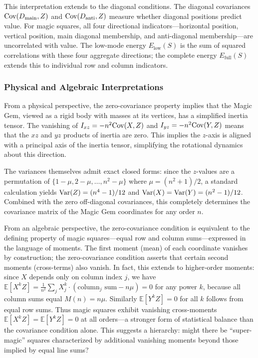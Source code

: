 This interpretation extends to the diagonal conditions. 
The diagonal covariances $\mathrm{Cov}(D_{\mathrm{main}}, Z)$ and $\mathrm{Cov}(D_{\mathrm{anti}}, Z)$ 
measure whether diagonal positions predict value.
For magic squares, all four directional indicators---horizontal position, vertical position, 
main diagonal membership, and anti-diagonal membership---are uncorrelated with value.
The low-mode energy $E_{\mathrm{low}}(S)$ is the sum of squared correlations with these four aggregate directions;
the complete energy $E_{\mathrm{full}}(S)$ extends this to individual row and column indicators.

\subsubsection{Physical and Algebraic Interpretations}

From a physical perspective, the zero-covariance property implies that the Magic Gem, 
viewed as a rigid body with masses at its vertices, has a simplified inertia tensor.
The vanishing of $I_{xz} = -n^2 \mathrm{Cov}(X,Z)$ and $I_{yz} = -n^2 \mathrm{Cov}(Y,Z)$ means that 
the $xz$ and $yz$ products of inertia are zero.
This implies the $z$-axis is aligned with a principal axis of the inertia tensor,
simplifying the rotational dynamics about this direction.

The variances themselves admit exact closed forms: since the $z$-values are a permutation of 
$\{1-\mu, 2-\mu, \ldots, n^2-\mu\}$ where $\mu = (n^2+1)/2$, a standard calculation yields
$\mathrm{Var}(Z) = (n^4-1)/12$ and $\mathrm{Var}(X) = \mathrm{Var}(Y) = (n^2-1)/12$.
Combined with the zero off-diagonal covariances, this completely determines the covariance matrix 
of the Magic Gem coordinates for any order $n$.

From an algebraic perspective, the zero-covariance condition is equivalent to the defining property 
of magic squares---equal row and column sums---expressed in the language of moments.
The first moment (mean) of each coordinate vanishes by construction;
the zero-covariance condition asserts that certain second moments (cross-terms) also vanish.
In fact, this extends to higher-order moments: 
since $X$ depends only on column index $j$, we have
$\mathbb{E}[X^k Z] = \frac{1}{n^2} \sum_j X_j^k \cdot (\text{column}_j \text{ sum} - n\mu) = 0$
for any power $k$, because all column sums equal $M(n) = n\mu$.
Similarly $\mathbb{E}[Y^k Z] = 0$ for all $k$ follows from equal row sums.
Thus magic squares exhibit vanishing cross-moments $\mathbb{E}[X^k Z] = \mathbb{E}[Y^k Z] = 0$ 
at all orders---a stronger form of statistical balance than the covariance condition alone.
This suggests a hierarchy: might there be ``super-magic'' squares 
characterized by additional vanishing moments beyond those implied by equal line sums?

